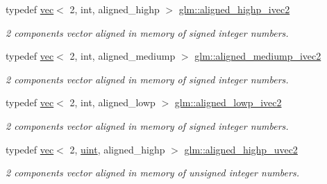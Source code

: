 \begin{DoxyCompactItemize}
\mbox{\label{group__gtc__type__aligned_ga34105808a80ef5dabd7807997dfef328}} 
typedef \hyperlink{structglm_1_1vec}{vec}$<$ 2, int, aligned\+\_\+highp $>$ \hyperlink{group__gtc__type__aligned_ga34105808a80ef5dabd7807997dfef328}{glm\+::aligned\+\_\+highp\+\_\+ivec2}
\begin{DoxyCompactList}\small\item\em 2 components vector aligned in memory of signed integer numbers. \end{DoxyCompactList}\item 
\mbox{\label{group__gtc__type__aligned_ga21c35fcb068f6d38f3aaed915c3e3b5a}} 
typedef \hyperlink{structglm_1_1vec}{vec}$<$ 2, int, aligned\+\_\+mediump $>$ \hyperlink{group__gtc__type__aligned_ga21c35fcb068f6d38f3aaed915c3e3b5a}{glm\+::aligned\+\_\+mediump\+\_\+ivec2}
\begin{DoxyCompactList}\small\item\em 2 components vector aligned in memory of signed integer numbers. \end{DoxyCompactList}\item 
\mbox{\label{group__gtc__type__aligned_ga186cb1ada403d7a52411f64c83295486}} 
typedef \hyperlink{structglm_1_1vec}{vec}$<$ 2, int, aligned\+\_\+lowp $>$ \hyperlink{group__gtc__type__aligned_ga186cb1ada403d7a52411f64c83295486}{glm\+::aligned\+\_\+lowp\+\_\+ivec2}
\begin{DoxyCompactList}\small\item\em 2 components vector aligned in memory of signed integer numbers. \end{DoxyCompactList}\item 
\mbox{\label{group__gtc__type__aligned_ga4497b2f3be81910c7a1bf632b51ac9a6}} 
typedef \hyperlink{structglm_1_1vec}{vec}$<$ 2, \hyperlink{group__core__precision_ga4fd29415871152bfb5abd588334147c8}{uint}, aligned\+\_\+highp $>$ \hyperlink{group__gtc__type__aligned_ga4497b2f3be81910c7a1bf632b51ac9a6}{glm\+::aligned\+\_\+highp\+\_\+uvec2}
\begin{DoxyCompactList}\small\item\em 2 components vector aligned in memory of unsigned integer numbers. \end{DoxyCompactList}\item 
\mbox{\label{group__gtc__type__aligned_gacb673fdb5622c457d9f8ec669bc32842}} 

\end{DoxyCompactItemize}
